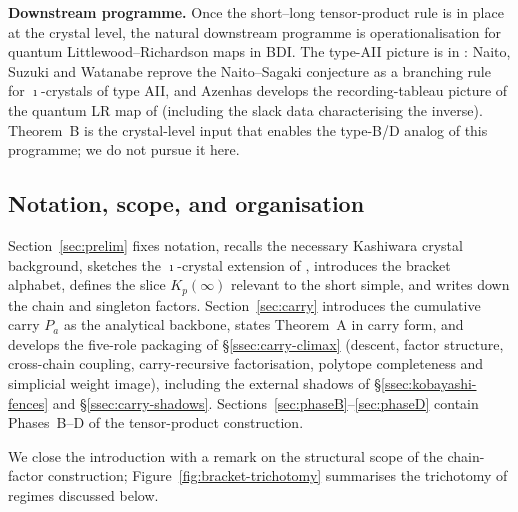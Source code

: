 \documentclass[11pt]{article}
\theoremstyle{definition}
\theoremstyle{remark}
\begin{document}
\medskip
\noindent\textbf{Downstream programme.}
Once the short--long tensor-product rule is in place at the crystal level, the natural
downstream programme is operationalisation for quantum Littlewood--Richardson maps in BDI.
The type-AII picture is in \cite{NSW2024,Azenhas2603,Azenhas2604}: Naito, Suzuki and Watanabe
\cite{NSW2024} reprove the Naito--Sagaki conjecture as a branching rule for $\imath$-crystals
of type AII, and Azenhas \cite{Azenhas2603,Azenhas2604} develops the recording-tableau picture
of the quantum LR map of \cite{Watanabe2110} (including the slack data characterising the
inverse). Theorem~B is the crystal-level input that enables the type-B/D analog of this
programme; we do not pursue it here.

\subsection{Notation, scope, and organisation}\label{ssec:scope}

Section~\ref{sec:prelim} fixes notation, recalls the necessary Kashiwara crystal background,
sketches the $\imath$-crystal extension of \cite{Watanabe2107,Watanabe2110}, introduces the
bracket alphabet, defines the slice $K_p(\infty)$ relevant to the short simple, and writes
down the chain and singleton factors. Section~\ref{sec:carry} introduces the cumulative
carry $P_a$ as the analytical backbone, states Theorem~A in carry form, and develops the
five-role packaging of \S\ref{ssec:carry-climax} (descent, factor structure, cross-chain
coupling, carry-recursive factorisation, polytope completeness and simplicial weight image),
including the external shadows of \S\ref{ssec:kobayashi-fences} and
\S\ref{ssec:carry-shadows}. Sections~\ref{sec:phaseB}--\ref{sec:phaseD} contain Phases~B--D
of the tensor-product construction.

We close the introduction with a remark on the structural scope of the chain-factor
construction; Figure~\ref{fig:bracket-trichotomy} summarises the trichotomy of regimes
discussed below.
\end{document}

